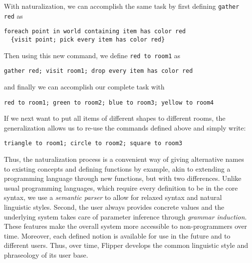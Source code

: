 \documentclass[letterpaper, 10 pt, conference]{ieeeconf}  %
\newcommand{\tool}{Flipper\xspace}
\begin{document}
\begin{example}
With naturalization, we can accomplish the same task by first defining
\lstinline{gather red} as
  \begin{lstlisting}
foreach point in world containing item has color red
  {visit point; pick every item has color red}
  \end{lstlisting}
Then using this new command, we define \lstinline{red to room1} as
\begin{lstlisting}
gather red; visit room1; drop every item has color red
  \end{lstlisting}
and finally we can accomplish our complete task with
\begin{lstlisting}
red to room1; green to room2; blue to room3; yellow to room4
\end{lstlisting}
%
If we next want to put all items of different shapes to different rooms,
the generalization allows us to re-use the commands defined above and simply
write:
  \begin{lstlisting}
triangle to room1; circle to room2; square to room3
  \end{lstlisting}
\end{example}

Thus, the naturalization process is a convenient way of
giving alternative names to existing concepts and defining functions by example,
akin to extending a programming language through new functions, but with two differences.
Unlike usual programming languages, which require every definition to be in the core syntax,
we use a \emph{semantic parser} to allow for relaxed syntax and natural linguistic styles.
Second, the user always provides concrete values and the underlying system takes care of parameter inference
through \emph{grammar induction}.
These features make the overall system more accessible to non-programmers over time.
%
%
Moreover, each defined notion is available for use in the future and to different users.
Thus, over time, \tool develops the common linguistic style and phraseology of its user base.
\end{document}
